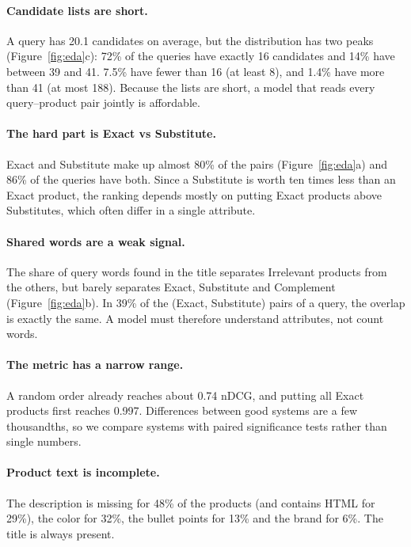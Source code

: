 \documentclass[12pt,a4paper]{report}
\begin{document}
\paragraph{Candidate lists are short.} A query has 20.1 candidates on average, but the distribution has two peaks (Figure~\ref{fig:eda}c): 72\% of the queries have exactly 16 candidates and 14\% have between 39 and 41. 7.5\% have fewer than 16 (at least 8), and 1.4\% have more than 41 (at most 188). Because the lists are short, a model that reads every query--product pair jointly is affordable.

\paragraph{The hard part is Exact vs Substitute.} Exact and Substitute make up almost 80\% of the pairs (Figure~\ref{fig:eda}a) and 86\% of the queries have both. Since a Substitute is worth ten times less than an Exact product, the ranking depends mostly on putting Exact products above Substitutes, which often differ in a single attribute.

\paragraph{Shared words are a weak signal.} The share of query words found in the title separates Irrelevant products from the others, but barely separates Exact, Substitute and Complement (Figure~\ref{fig:eda}b). In 39\% of the (Exact, Substitute) pairs of a query, the overlap is exactly the same. A model must therefore understand attributes, not count words.

\paragraph{The metric has a narrow range.} A random order already reaches about 0.74 nDCG, and putting all Exact products first reaches 0.997. Differences between good systems are a few thousandths, so we compare systems with paired significance tests rather than single numbers.

\paragraph{Product text is incomplete.} The description is missing for 48\% of the products (and contains HTML for 29\%), the color for 32\%, the bullet points for 13\% and the brand for 6\%. The title is always present.
\end{document}
